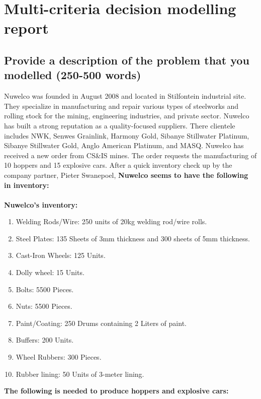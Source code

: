 \documentclass[a4paper,oneside,11pt]{book}
\begin{document}
\MakeTitle 
{} 
\tableofcontents
\listoffigures
\cleardoublepage 
{} 
\pagestyle{plain}
\chapter{Multi-criteria decision modelling report}
\section{Provide a description of the problem that you modelled (250-500 words)}
Nuwelco was founded in August 2008 and located in Stilfontein industrial site. They specialize in manufacturing and repair various types of steelworks and rolling stock for the mining, engineering industries, and private sector. Nuwelco has built a strong reputation as a quality-focused suppliers. There clientele includes NWK, Senwes Grainlink, Harmony Gold, Sibanye Stillwater Platinum, Sibanye Stillwater Gold, Anglo American Platinum, and MASQ.
Nuwelco has received a new order from CS\&IS mines. The order requests the manufacturing of 10 hoppers and 15 explosive cars. After a quick inventory check up by the company partner, Pieter Swanepoel, \textbf{Nuwelco seems to have the following in inventory:}
\\\\
\textbf{Nuwelco's inventory:}
\begin{enumerate}
    \item Welding Rods/Wire: 250 units of 20kg welding rod/wire rolls.
    \item Steel Plates: 135 Sheets of 3mm thickness and 300 sheets of 5mm thickness.
    \item Cast-Iron Wheels: 125 Units.
    \item Dolly wheel: 15 Units.
    \item Bolts: 5500 Pieces.
    \item Nuts: 5500 Pieces.
    \item Paint/Coating: 250 Drums containing 2 Liters of paint.
    \item Buffers: 200 Units.
    \item Wheel Rubbers: 300 Pieces.
    \item Rubber lining: 50 Units of 3-meter lining.
\end{enumerate}
\textbf{The following is needed to produce hoppers and explosive cars:}
\\\\
\end{document}
